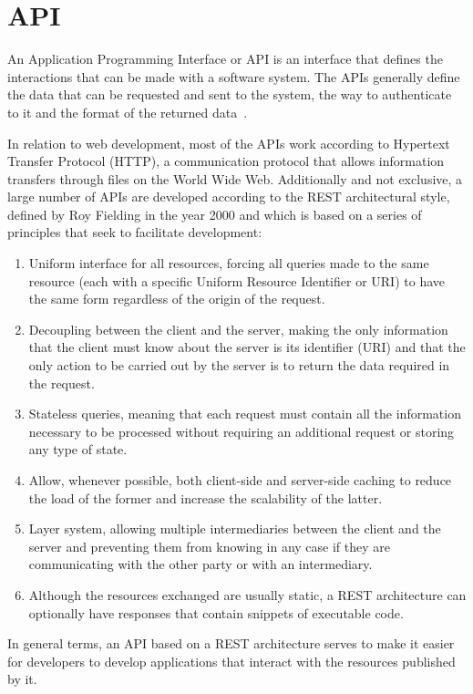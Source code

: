 \section{API}

\nonzeroparskip An Application Programming Interface or API is an interface that defines the interactions that can be made with a software system. The APIs generally define the data that can be requested and sent to the system, the way to authenticate to it and the format of the returned data~\cite{ibm_restapi}.

\nonzeroparskip In relation to web development, most of the APIs work according to Hypertext Transfer Protocol (HTTP), a communication protocol that allows information transfers through files on the World Wide Web. Additionally and not exclusive, a large number of APIs are developed according to the REST architectural style, defined by Roy Fielding in the year 2000 and which is based on a series of principles that seek to facilitate development:
\begin{enumerate}
	\item Uniform interface for all resources, forcing all queries made to the same resource (each with a specific Uniform Resource Identifier or URI) to have the same form regardless of the origin of the request.
	\item Decoupling between the client and the server, making the only information that the client must know about the server is its identifier (URI) and that the only action to be carried out by the server is to return the data required in the request.
	\item Stateless queries, meaning that each request must contain all the information necessary to be processed without requiring an additional request or storing any type of state.
	\item Allow, whenever possible, both client-side and server-side caching to reduce the load of the former and increase the scalability of the latter.
	\item Layer system, allowing multiple intermediaries between the client and the server and preventing them from knowing in any case if they are communicating with the other party or with an intermediary.
	\item Although the resources exchanged are usually static, a REST architecture can optionally have responses that contain snippets of executable code.
\end{enumerate}

\nonzeroparskip In general terms, an API based on a REST architecture serves to make it easier for developers to develop applications that interact with the resources published by it.


